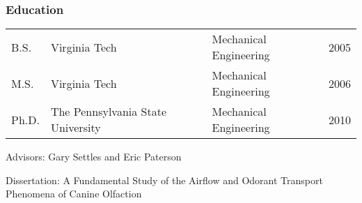 \subsubsection*{Education}
\vspace{-0.15in}

\begin{tabular}{llll}
B.S. & Virginia Tech & Mechanical Engineering & 2005 \\
M.S. & Virginia Tech & Mechanical Engineering & 2006 \\
Ph.D. & The Pennsylvania State University & Mechanical Engineering & 2010 \\
\end{tabular}

\vspace{-0.1in}
\hspace*{0.2in}Advisors: Gary Settles and Eric Paterson

\vspace{-0.1in}
\hspace*{0.2in}Dissertation: A Fundamental Study of the Airflow and Odorant Transport Phenomena of Canine Olfaction

